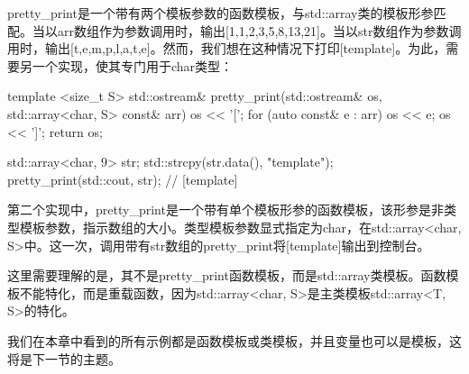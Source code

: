 pretty\_print是一个带有两个模板参数的函数模板，与std::array类的模板形参匹配。当以arr数组作为参数调用时，输出[1,1,2,3,5,8,13,21]。当以str数组作为参数调用时，输出[t,e,m,p,l,a,t,e]。然而，我们想在这种情况下打印[template]。为此，需要另一个实现，使其专门用于char类型：

\begin{cpp}
template <size_t S>
std::ostream& pretty_print(std::ostream& os,
						   std::array<char, S> const& arr)
{
	os << '[';
	for (auto const& e : arr)
		os << e;
	os << ']';
	return os;
}

std::array<char, 9> str;
std::strcpy(str.data(), "template");
pretty_print(std::cout, str); // [template]
\end{cpp}

第二个实现中，pretty\_print是一个带有单个模板形参的函数模板，该形参是非类型模板参数，指示数组的大小。类型模板参数显式指定为char，在std::array<char, S>中。这一次，调用带有str数组的pretty\_print将[template]输出到控制台。

这里需要理解的是，其不是pretty\_print函数模板，而是std::array类模板。函数模板不能特化，而是重载函数，因为std::array<char, S>是主类模板std::array<T, S>的特化。

我们在本章中看到的所有示例都是函数模板或类模板，并且变量也可以是模板，这将是下一节的主题。


